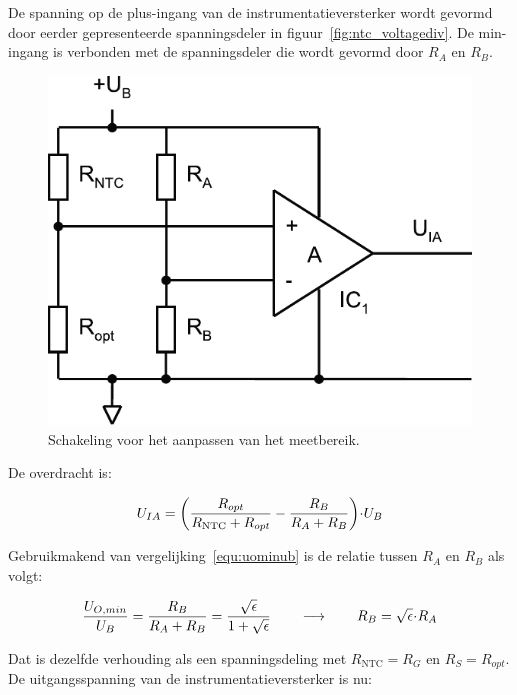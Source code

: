 \documentclass[12pt,a4paper,final,twoside,fleqn]{article}
\newcommand{\rntc}{R_\text{NTC}}
\newcommand{\ropt}{R_{opt}}
\let\oldcdot\cdot
\renewcommand{\cdot}{\kern-.10em\oldcdot\kern-.10em}
\begin{document}
De spanning op de plus-ingang van de instrumentatieversterker wordt gevormd door eerder
gepresenteerde spanningsdeler in figuur~\ref{fig:ntc_voltagediv}.
De min-ingang is verbonden met de spanningsdeler die wordt gevormd door $R_A$ en $R_B$.

\begin{figure}[ht!]
\centering
\includegraphics[scale=0.63]{drawings/ntc_ampli}
\caption{Schakeling voor het aanpassen van het meetbereik.}
\label{fig:ntc_ampli}
\end{figure}


De overdracht is:

\begin{equation}
U_{IA} = \left( \dfrac{\ropt}{\rntc+\ropt} - \dfrac{R_B}{R_A+R_B} \right)\cdot U_B
\end{equation}

Gebruikmakend van vergelijking~\eqref{equ:uominub} is de relatie
tussen $R_A$ en $R_B$ als volgt:

\begin{equation}
\dfrac{U_{O,min}}{U_B} = \dfrac{R_B}{R_A+R_B} = \dfrac{\sqrt{\epsilon}}{1+\sqrt{\epsilon}} \qquad\longrightarrow\qquad R_B = \sqrt{\epsilon}\cdot R_A
\end{equation}

Dat is dezelfde verhouding als een spanningsdeling met $\rntc = R_G$ en
$R_S = \ropt$. De uitgangsspanning van de instrumentatieversterker is nu:
\end{document}
